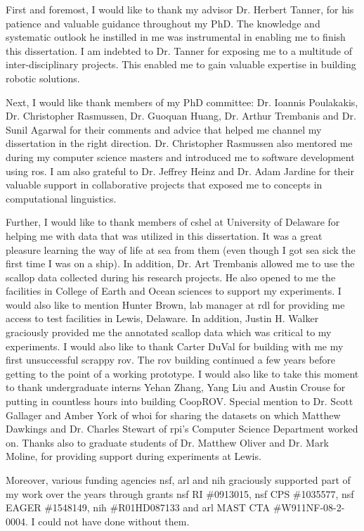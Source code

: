 First and foremost, I would like to thank my advisor Dr. Herbert Tanner, for his patience and valuable guidance throughout my PhD. The knowledge and systematic outlook he instilled in me was instrumental in enabling me to finish this dissertation. I am indebted to Dr. Tanner for exposing me to a multitude of inter-disciplinary projects. This enabled me to gain valuable expertise in building robotic solutions.

Next, I would like thank members of my PhD committee: Dr. Ioannis Poulakakis, 
Dr. Christopher Rasmussen, Dr. Guoquan Huang, Dr. Arthur Trembanis and Dr. Sunil Agarwal for their comments and advice that helped me channel my dissertation in the right direction. Dr. Christopher Rasmussen also mentored me during my computer science masters and introduced me to software development using \gls{ros}. I am also grateful to Dr. Jeffrey Heinz and Dr. Adam Jardine for their valuable support in collaborative projects that exposed me to concepts in computational linguistics.

Further, I would like to thank members of \gls{cshel} at University of Delaware for helping me with data that was utilized in this dissertation. It was a great pleasure learning the way of life at sea from them (even though I got sea sick the first time I was on a ship). In addition, Dr. Art Trembanis allowed me to use the scallop data collected during his research projects. He also opened to me the facilities in College of Earth and Ocean sciences to support my experiments. I would also like to mention Hunter Brown, lab manager at \gls{rdl} for providing me access to test facilities in Lewis, Delaware. In addition, Justin H. Walker graciously provided me the annotated scallop data which was critical to my experiments. I would also like to thank Carter DuVal for building with me my first unsuccessful scrappy \gls{rov}. The \gls{rov} building continued a few years before getting to the point of a working prototype. I would also like to take this moment to thank undergraduate interns Yehan Zhang, Yang Liu and Austin Crouse for putting in countless hours into building CoopROV. Special mention to Dr. Scott Gallager and Amber York of \gls{whoi} for sharing the datasets on which Matthew Dawkings and Dr. Charles Stewart of \gls{rpi}’s Computer Science Department worked on. Thanks also to graduate students of Dr. Matthew Oliver and Dr. Mark Moline, for providing 
support during experiments at Lewis.

Moreover, various funding agencies \gls{nsf}, \gls{arl} and \gls{nih} graciously supported part of my work over the years through grants \gls{nsf} RI \#0913015, \gls{nsf} CPS \#1035577, \gls{nsf} EAGER \#1548149, \gls{nih} \#R01HD087133 and \gls{arl} MAST CTA \#W911NF-08-2-0004. I could not have done without them.

